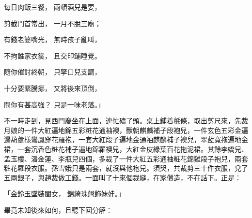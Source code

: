 每日肉飯三餐，  兩頓酒兒是要，

剪截門首常出，  一月不脫三廟；

有錢老婆嘴光，  無時孩子亂叫，

不拘誰家衣裳，  且交印鋪睡覺。

隨你催討終朝，  只拏口兒支調，

十分要緊騰挪，  又將後來頂倒，

問你有甚高強？  只是一味老落。」

不一時走到，見西門慶坐在上面，連忙磕了頭。桌上鋪着氈條，取出剪尺來，先裁月娘的一件大紅遍地錦五彩粧花通袖襖，獸朝麒麟補子段袍兒，一件玄色五彩金遍邊葫蘆樣鸞鳳穿花羅袍，一套大紅段子遍地金通袖麒麟補子襖兒，翠藍寬拖遍地金裙，一套沉香色粧花補子遍地錦羅襖兒，大紅金皮綠葉百花拖泥裙。其餘李嬌兒、孟玉樓、潘金蓮、李瓶兒四個，多裁了一件大紅五彩通袖粧花錦雞段子袍兒，兩套粧花羅段衣服。孫雪娥只是兩套，就沒與他袍兒。須臾，共裁剪三十件衣服，兌了五兩銀子，與趙裁做工錢。一面叫了十來個裁縫，在家儹造，不在話下。正是：

「金鈴玉墜裝閨女，  錦綺珠翹飾妹娃。」

畢竟未知後來如何，且聽下回分解：
